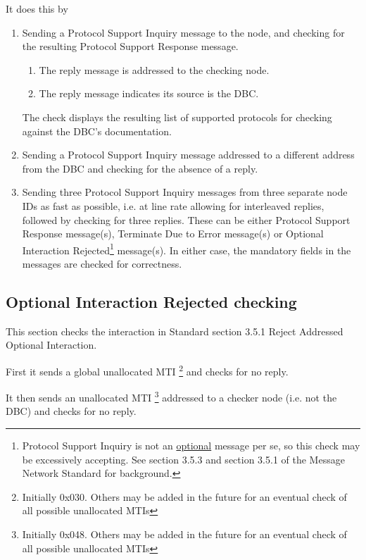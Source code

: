 It does this by 
\begin{enumerate}
\item Sending a Protocol Support Inquiry message to the node, 
and checking for the resulting Protocol Support Response message.  
    \begin{enumerate}
    \item The reply message is addressed to the checking node.
    \item The reply message indicates its source is the DBC.
    \end{enumerate}
The check displays the resulting list of supported protocols for checking against the 
DBC's documentation.

\item Sending a Protocol Support Inquiry message addressed to a different address from the DBC
        and checking for the absence of a reply.
        
\item Sending three Protocol Support Inquiry messages from three separate node IDs
        as fast as possible, i.e. at line rate allowing for interleaved replies, 
        followed by checking for three replies.  These can be either Protocol Support 
        Response message(s), 
        Terminate Due to Error message(s)
        or Optional Interaction Rejected\footnote{
            Protocol Support Inquiry is not an \underline{optional} message per se, 
            so this check may be excessively accepting. See section 3.5.3 and
            section 3.5.1 of the Message Network Standard for background.
        }
        message(s).  In either
        case, the mandatory fields in the messages are checked for correctness.
\end{enumerate}


\subsection{Optional Interaction Rejected checking}

This section checks the interaction in Standard section 3.5.1 Reject Addressed Optional Interaction.

First it sends a global unallocated MTI
\footnote{Initially 0x030. Others may be added in the future for an eventual
    check of all possible unallocated MTIs}
and checks for no reply.

It then sends an unallocated MTI
\footnote{Initially 0x048. Others may be added in the future for an eventual
    check of all possible unallocated MTIs}
addressed to a checker node (i.e. not the DBC)
and checks for no reply.


